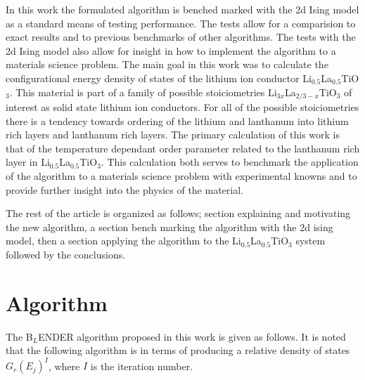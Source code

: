 \documentclass[aps,prl,reprint,superscriptaddress,showkeys]{revtex4-1}
\begin{document}
   In this work the formulated algorithm is benched marked with the 2d Ising model as a standard means of testing  performance.  The tests allow for a comparision to exact results and to previous benchmarks of other algorithms. The tests with the 2d Ising model also allow for insight in how to implement the algorithm to a materials science problem. The main goal in this work  was to calculate the configurational energy density of states of the lithium ion conductor Li$_{0.5}$La$_{0.5}$TiO$_3$.  This material is part of a family of possible stoiciometries Li$_{3x}$La$_{2/3 -x}$TiO$_3$ of interest as solid state lithium ion conductors\cite{domainboundaries,P4mmmstrucuture,imaginary_phonons,GENG2009555,peculiarities,LLTOreview,Li_La_ordering_computational}. For all of the possible stoiciometries there is a tendency towards ordering of the lithium and lanthanum into lithium rich layers and lanthanum rich layers.  The primary calculation of this work is that of the temperature dependant order parameter related to the lanthanum rich layer in Li$_{0.5}$La$_{0.5}$TiO$_3$. This calculation both serves to benchmark the application of the algorithm to a materials science problem with experimental knowns and to provide further insight into the physics of the material. 
   
   The rest of the article is organized as follows;  section explaining and motivating the new algorithm, a section bench marking the algorithm with the 2d ising model, then a section applying the algorithm to the Li$_{0.5}$La$_{0.5}$TiO$_3$ system followed by the conclusions. 

\section{Algorithm}
   
The B$_{L}$ENDER algorithm proposed in this work  is given as follows. It is noted that the following algorithm is in terms of producing a relative density of states $G_{r}(E_j)^I$, where $I$ is the iteration number. 
\end{document}
